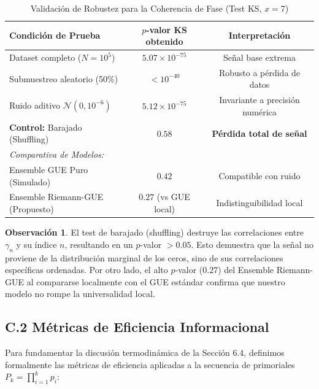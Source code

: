 \documentclass[12pt, a4paper]{article}
\theoremstyle{plain}
\theoremstyle{definition}
\newtheorem{observacion}[teorema]{Observación}
\begin{document}
\begin{table}[H]
\centering
\caption{Validación de Robustez para la Coherencia de Fase (Test KS, $x=7$)}
\label{tab:robustez_actualizada}
\begin{tabular}{@{}lcc@{}}
\toprule
\textbf{Condición de Prueba} & \textbf{$p$-valor KS obtenido} & \textbf{Interpretación} \\
\midrule
Dataset completo ($N=10^5$) & $5.07 \times 10^{-75}$ & Señal base extrema \\
Submuestreo aleatorio (50\%) & $< 10^{-40}$ & Robusto a pérdida de datos \\
Ruido aditivo $\mathcal{N}(0, 10^{-6})$ & $5.12 \times 10^{-75}$ & Invariante a precisión numérica \\
\textbf{Control:} Barajado (Shuffling) & $0.58$ & \textbf{Pérdida total de señal} \\
\midrule
\textit{Comparativa de Modelos:} & & \\
Ensemble GUE Puro (Simulado) & $0.42$ & Compatible con ruido \\
Ensemble Riemann-GUE (Propuesto) & $0.27$ (vs GUE local) & Indistinguibilidad local \\
\bottomrule
\end{tabular}
\end{table}

\begin{observacion}
El test de barajado (shuffling) destruye las correlaciones entre $\gamma_n$ y su índice $n$, resultando en un $p$-valor $> 0.05$. Esto demuestra que la señal no proviene de la distribución marginal de los ceros, sino de sus correlaciones específicas ordenadas. Por otro lado, el alto $p$-valor ($0.27$) del Ensemble Riemann-GUE al compararse localmente con el GUE estándar confirma que nuestro modelo no rompe la universalidad local.
\end{observacion}

\subsection{C.2 Métricas de Eficiencia Informacional}

Para fundamentar la discusión termodinámica de la Sección 6.4, definimos formalmente las métricas de eficiencia aplicadas a la secuencia de primoriales $P_k = \prod_{i=1}^k p_i$:
\end{document}
